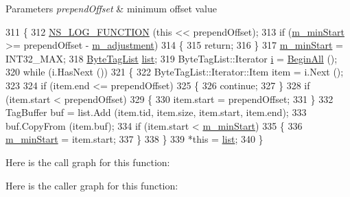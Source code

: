 \begin{DoxyParams}{Parameters}
{\em prepend\+Offset} & minimum offset value \\
\hline
\end{DoxyParams}

\begin{DoxyCode}
311 \{
312   \hyperlink{log-macros-disabled_8h_a90b90d5bad1f39cb1b64923ea94c0761}{NS\_LOG\_FUNCTION} (\textcolor{keyword}{this} << prependOffset);
313   \textcolor{keywordflow}{if} (\hyperlink{classns3_1_1ByteTagList_a24017961aabc3bcd82344489dbeefcc3}{m\_minStart} >= prependOffset - \hyperlink{classns3_1_1ByteTagList_ab8fc894533bb31b08e75f480f3a284f4}{m\_adjustment})
314     \{
315       \textcolor{keywordflow}{return};
316     \}
317   \hyperlink{classns3_1_1ByteTagList_a24017961aabc3bcd82344489dbeefcc3}{m\_minStart} = INT32\_MAX;
318   \hyperlink{classns3_1_1ByteTagList_a04f73de90aafb33f963ae60b8eb37c63}{ByteTagList} \hyperlink{openflow-interface_8h_afd9bcfa176617760671b67580f536fa7}{list};
319   ByteTagList::Iterator \hyperlink{bernuolliDistribution_8m_a6f6ccfcf58b31cb6412107d9d5281426}{i} = \hyperlink{classns3_1_1ByteTagList_ac4f33846ef6a84a64ede38b2de1564ba}{BeginAll} ();
320   \textcolor{keywordflow}{while} (i.HasNext ())
321     \{
322       ByteTagList::Iterator::Item item = i.Next ();
323 
324       \textcolor{keywordflow}{if} (item.end <= prependOffset)
325         \{
326           \textcolor{keywordflow}{continue};
327         \}
328       \textcolor{keywordflow}{if} (item.start < prependOffset)
329         \{
330           item.start = prependOffset;
331         \}
332       TagBuffer buf = list.Add (item.tid, item.size, item.start, item.end);
333       buf.CopyFrom (item.buf);
334       \textcolor{keywordflow}{if} (item.start < \hyperlink{classns3_1_1ByteTagList_a24017961aabc3bcd82344489dbeefcc3}{m\_minStart})
335         \{
336           \hyperlink{classns3_1_1ByteTagList_a24017961aabc3bcd82344489dbeefcc3}{m\_minStart} = item.start;
337         \}
338     \}
339   *\textcolor{keyword}{this} = \hyperlink{openflow-interface_8h_afd9bcfa176617760671b67580f536fa7}{list};
340 \}
\end{DoxyCode}


Here is the call graph for this function\+:




Here is the caller graph for this function\+:


